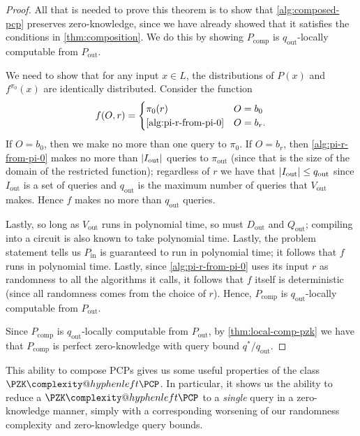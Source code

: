 \documentclass[english,12pt]{reedthesis}
\makeatletter
\theoremstyle{plain}
\theoremstyle{definition}
\theoremstyle{remark}
\DeclareMathOperator{\comp}{comp}
\DeclareMathOperator{\out}{out}
\DeclareMathOperator{\oin}{in}
\DeclarePairedDelimiter{\abs}{\lvert}{\rvert}
\newcommand{\PZKPCP}{%
  \PZK\complexity@hyphenleft\PCP
}
\makeatother
\begin{document}
\begin{proof}
  All that is needed to prove this theorem is to show that
  \cref{alg:composed-pcp} preserves zero-knowledge, since we have already showed
  that it satisfies the conditions in \cref{thm:composition}. We do this by
  showing $P_{\comp}$ is $q_{\out}$-locally computable from $P_{\out}$.

  We need to show that for any input $x \in L$, the distributions of $P(x)$ and
  $f^{\pi_{0}}(x)$ are identically distributed. Consider the function
  \begin{equation}
    f(O, r) = \begin{cases}
      \pi_{0}(r) & O = b_{0} \\
      \text{\cref{alg:pi-r-from-pi-0}} & O = b_{r}.
    \end{cases}
  \end{equation}
  If $O = b_{0}$, then we make no more than one query to $\pi_{0}$. If
  $O = b_{r}$, then \cref{alg:pi-r-from-pi-0} makes no more than
  $\abs{I_{\out}}$ queries to $\pi_{\out}$ (since that is the size of the domain
  of the restricted function); regardless of $r$ we have that
  $\abs{I_{\out}} \le q_{\out}$ since $I_{\out}$ is a set of queries and
  $q_{\out}$ is the maximum number of queries that $V_{\out}$ makes. Hence $f$
  makes no more than $q_{\out}$ queries.

  Lastly, so long as $V_{\out}$ runs in polynomial time, so must $D_{\out}$ and
  $Q_{\out}$; compiling into a circuit is also known to take polynomial time.
  Lastly, the problem statement tells us $P_{\oin}$ is guaranteed to run in
  polynomial time; it follows that $f$ runs in polynomial time. Lastly, since
  \cref{alg:pi-r-from-pi-0} uses its input $r$ as randomness to all the
  algorithms it calls, it follows that $f$ itself is deterministic (since all
  randomness comes from the choice of $r$). Hence, $P_{\comp}$ is
  $q_{\out}$-locally computable from $P_{\out}$.

  Since $P_{\comp}$ is $q_{\out}$-locally computable from $P_{\out}$, by
  \cref{thm:local-comp-pzk} we have that $P_{\comp}$ is perfect zero-knowledge
  with query bound $q^{*}/q_{\out}$.
\end{proof}

This ability to compose PCPs gives us some useful properties of the class
$\PZKPCP$. In particular, it shows us the ability to reduce a $\PZKPCP$ to a
\emph{single} query in a zero-knowledge manner, simply with a corresponding
worsening of our randomness complexity and zero-knowledge query bounds.
\end{document}
